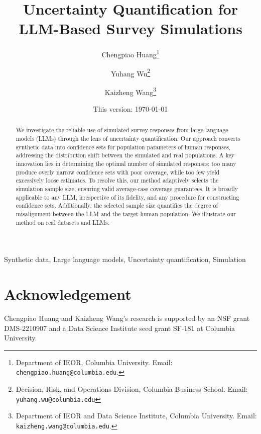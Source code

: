 \documentclass[english,11pt]{article}
\begin{document}
\title{Uncertainty Quantification for LLM-Based Survey Simulations}




\author{Chengpiao Huang\thanks{Department of IEOR, Columbia University. Email: \texttt{chengpiao.huang@columbia.edu}.}
	\and Yuhang Wu\thanks{Decision, Risk, and Operations Division, Columbia Business School. Email: \texttt{yuhang.wu@columbia.edu}}
	\and Kaizheng Wang\thanks{Department of IEOR and Data Science Institute, Columbia University. Email: \texttt{kaizheng.wang@columbia.edu}.}
}


\date{This version: \today}

\maketitle

\begin{abstract}
We investigate the reliable use of simulated survey responses from large language models (LLMs) through the lens of uncertainty quantification. Our approach converts synthetic data into confidence sets for population parameters of human responses, addressing the distribution shift between the simulated and real populations. A key innovation lies in determining the optimal number of simulated responses: too many produce overly narrow confidence sets with poor coverage, while too few yield excessively loose estimates. To resolve this, our method adaptively selects the simulation sample size, ensuring valid average-case coverage guarantees. It is broadly applicable to any LLM, irrespective of its fidelity, and any procedure for constructing confidence sets. Additionally, the selected sample size quantifies the degree of misalignment between the LLM and the target human population. We illustrate our method on real datasets and LLMs. 
\end{abstract}
 Synthetic data, Large language models, Uncertainty quantification, Simulation











\section*{Acknowledgement}
Chengpiao Huang and Kaizheng Wang's research is supported by an NSF grant DMS-2210907 and a Data Science Institute seed grant SF-181 at Columbia University.


\newpage 
\appendix










{


}
\end{document}
